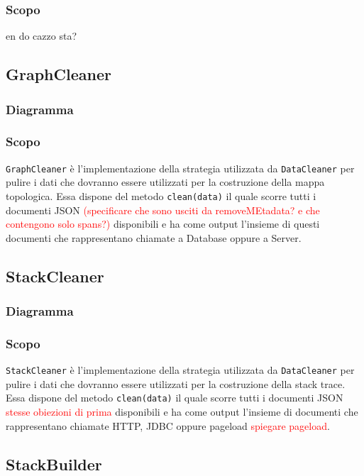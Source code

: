 	\subsubsection{Scopo}
	en do cazzo sta?
	
	
\subsection{GraphCleaner}
\label{sec:GraphCleaner}
	\subsubsection{Diagramma}

	\subsubsection{Scopo}
	\texttt{GraphCleaner} è l'implementazione della strategia utilizzata da \texttt{DataCleaner} per pulire i dati che dovranno essere utilizzati per la costruzione della mappa topologica. Essa dispone del metodo \texttt{clean(data)} il quale scorre tutti i documenti JSON \textcolor{red}{(specificare che sono usciti da removeMEtadata? e che contengono solo spans?)} disponibili e ha come output l'insieme di questi documenti che rappresentano chiamate a Database oppure a Server.
	
\subsection{StackCleaner}
\label{sec:StackCleaner}
	\subsubsection{Diagramma}
	
	\subsubsection{Scopo}
	\texttt{StackCleaner} è l'implementazione della strategia utilizzata da \texttt{DataCleaner} per pulire i dati che dovranno essere utilizzati per la costruzione della stack trace. Essa dispone del metodo \texttt{clean(data)} il quale scorre tutti i documenti JSON \textcolor{red}{stesse obiezioni di prima} disponibili e ha come output l'insieme di documenti che rappresentano chiamate HTTP, JDBC oppure pageload \textcolor{red}{spiegare pageload}.
	

\subsection{StackBuilder}
\label{sec:StackBuilder}
